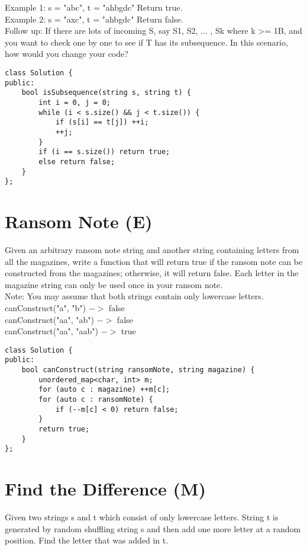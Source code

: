 Example 1:
s = "abc", t = "ahbgdc"
Return true.\\

Example 2:
s = "axc", t = "ahbgdc"
Return false.\\

Follow up:
If there are lots of incoming S, say S1, S2, ... , Sk where k >= 1B, and you want to check one by one to see if T has its subsequence. In this scenario, how would you change your code?\\

\begin{lstlisting}
class Solution {
public:
    bool isSubsequence(string s, string t) {
        int i = 0, j = 0;
        while (i < s.size() && j < t.size()) {
            if (s[i] == t[j]) ++i;
            ++j;
        }
        if (i == s.size()) return true;
        else return false;
    }
};
\end{lstlisting}


\section{Ransom Note (E)}
Given an arbitrary ransom note string and another string containing letters from all the magazines, write a function that will return true if the ransom note can be constructed from the magazines; otherwise, it will return false. Each letter in the magazine string can only be used once in your ransom note. \\

Note:
You may assume that both strings contain only lowercase letters.\\

canConstruct("a", "b") $->$ false\\
canConstruct("aa", "ab") $->$ false\\
canConstruct("aa", "aab") $->$ true\\

\begin{lstlisting}
class Solution {
public:
    bool canConstruct(string ransomNote, string magazine) {
        unordered_map<char, int> m;
        for (auto c : magazine) ++m[c];
        for (auto c : ransomNote) {
            if (--m[c] < 0) return false;
        }
        return true;
    }
};
\end{lstlisting}


\section{Find the Difference (M)}
Given two strings s and t which consist of only lowercase letters. String t is generated by random shuffling string s and then add one more letter at a random position. Find the letter that was added in t. \\


